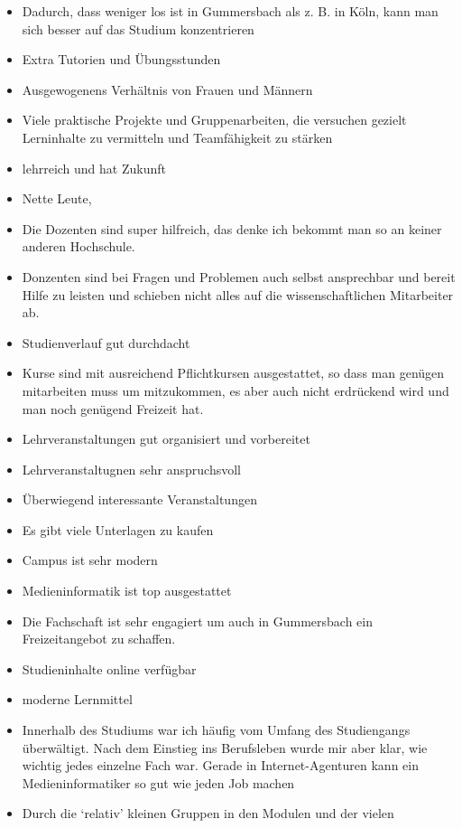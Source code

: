 \begin{itemize}
\tightlist
\item
  Dadurch, dass weniger los ist in Gummersbach als z. B. in Köln, kann
  man sich besser auf das Studium konzentrieren
\item
  Extra Tutorien und Übungsstunden
\item
  Ausgewogenens Verhältnis von Frauen und Männern
\item
  Viele praktische Projekte und Gruppenarbeiten, die versuchen gezielt
  Lerninhalte zu vermitteln und Teamfähigkeit zu stärken
\item
  lehrreich und hat Zukunft
\item
  Nette Leute,
\item
  Die Dozenten sind super hilfreich, das denke ich bekommt man so an
  keiner anderen Hochschule.
\item
  Donzenten sind bei Fragen und Problemen auch selbst ansprechbar und
  bereit Hilfe zu leisten und schieben nicht alles auf die
  wissenschaftlichen Mitarbeiter ab.
\item
  Studienverlauf gut durchdacht
\item
  Kurse sind mit ausreichend Pflichtkursen ausgestattet, so dass man
  genügen mitarbeiten muss um mitzukommen, es aber auch nicht erdrückend
  wird und man noch genügend Freizeit hat.
\item
  Lehrveranstaltungen gut organisiert und vorbereitet
\item
  Lehrveranstaltugnen sehr anspruchsvoll
\item
  Überwiegend interessante Veranstaltungen~
\item
  Es gibt viele Unterlagen zu kaufen
\item
  Campus ist sehr modern
\item
  Medieninformatik ist top ausgestattet
\item
  Die Fachschaft ist sehr engagiert um auch in Gummersbach ein
  Freizeitangebot zu schaffen.
\item
  Studieninhalte online verfügbar
\item
  moderne Lernmittel
\item
  Innerhalb des Studiums war ich häufig vom Umfang des Studiengangs
  überwältigt. Nach dem Einstieg ins Berufsleben wurde mir aber klar,
  wie wichtig jedes einzelne Fach war. Gerade in Internet-Agenturen kann
  ein Medieninformatiker so gut wie jeden Job machen
\item
  Durch die `relativ' kleinen Gruppen in den Modulen und der vielen

\end{itemize}
